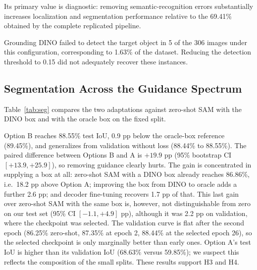 \documentclass[conference]{IEEEtran}
\begin{document}
Its primary value is diagnostic: removing semantic-recognition errors substantially increases localization and segmentation performance relative to the 69.41\% obtained by the complete replicated pipeline.

Grounding DINO failed to detect the target object in 5 of the 306 images under this configuration, corresponding to 1.63\% of the dataset. Reducing the detection threshold to 0.15 did not adequately recover these instances.


\subsection{Segmentation Across the Guidance Spectrum}

Table~\ref{tab:seg} compares the two adaptations against zero-shot SAM with the DINO box and with the oracle box on the fixed split.

\begin{table}[t]
\centering
\caption{Key-object segmentation (IoU and Dice in \%). Validation: 37 images; test: 61 images, with 95\% bootstrap confidence intervals. DINO boxes come from Grounding DINO prompted with the ground-truth object name. Option A validation is the original-resolution evaluation of the chosen run.}
\label{tab:seg}
\end{table}

Option B reaches 88.55\% test IoU, 0.9 pp below the oracle-box reference (89.45\%), and generalizes from validation without loss (88.44\% to 88.55\%). The paired difference between Options B and A is $+19.9$ pp (95\% bootstrap CI $[+13.9, +25.9]$), so removing guidance clearly hurts. The gain is concentrated in supplying a box at all: zero-shot SAM with a DINO box already reaches 86.86\%, i.e.\ 18.2 pp above Option A; improving the box from DINO to oracle adds a further 2.6 pp; and decoder fine-tuning recovers 1.7 pp of that. This last gain over zero-shot SAM with the same box is, however, not distinguishable from zero on our test set (95\% CI $[-1.1, +4.9]$ pp), although it was 2.2 pp on validation, where the checkpoint was selected. The validation curve is flat after the second epoch (86.25\% zero-shot, 87.35\% at epoch 2, 88.44\% at the selected epoch 26), so the selected checkpoint is only marginally better than early ones. Option A's test IoU is higher than its validation IoU (68.63\% versus 59.85\%); we suspect this reflects the composition of the small splits. These results support H3 and H4.
\end{document}
